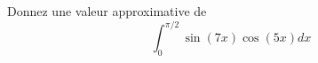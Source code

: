 \begin{exercice}\label{exoMatlab0012}

	Donnez une valeur approximative de
	\begin{equation}
		\int_0^{\pi/2}\sin(7x)\cos(5x)dx
	\end{equation}

\end{exercice}
